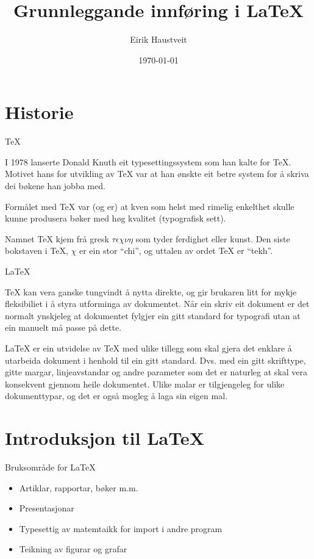 \documentclass[10pt,a4paper]{beamer}
\title{Grunnleggande innføring i \LaTeX}
\date{\today}
\author{Eirik Haustveit}
\institute{Institutt for datateknologi, elektroteknologi og realfag}
\begin{document}
	
	\titlepage
	
	\section{Historie}
	\label{sec:history}
	
	\begin{frame}{\TeX}
		
		I 1978 lanserte Donald Knuth eit typesettingssystem som han kalte for \TeX{}. Motivet hans for utvikling av \TeX{} var at han ønskte eit betre system for å skriva dei bøkene han jobba med.
		
		Formålet med \TeX{} var (og er) at kven som helst med rimelig enkelthet skulle kunne produsera bøker med høg kvalitet (typografisk sett).
		
		Namnet \TeX{} kjem frå gresk \(\tau\epsilon\chi\nu\eta\) som tyder ferdighet eller kunst. Den siste bokstaven i \TeX{}, $\chi$ er ein stor ``chi'', og uttalen av ordet \TeX{} er ``tekh''.
		
	\end{frame}
	
	\begin{frame}{\LaTeX}
		
		
		
		\TeX{} kan vera ganske tungvindt å nytta direkte, og gir brukaren litt for mykje fleksibiliet i å styra utforminga av dokumentet. Når ein skriv eit dokument er det normalt ynskjeleg at dokumentet fylgjer ein gitt standard for typografi utan at ein manuelt må passe på dette.
		
		\LaTeX{} er ein utvidelse av \TeX{} med ulike tillegg som skal gjera det enklare å utarbeida dokument i henhold til ein gitt standard. Dvs. med ein gitt skrifttype, gitte margar, linjeavstandar og andre parameter som det er naturleg at skal vera konsekvent gjennom heile dokumentet. Ulike malar er tilgjengeleg for ulike dokumenttypar, og det er også mogleg å laga sin eigen mal.
		
	\end{frame}
	
	\section{Introduksjon til \LaTeX}
	
	\begin{frame}{Bruksområde for \LaTeX}
		
		\begin{itemize}
			\item Artiklar, rapportar, bøker m.m.
			\item Presentasjonar
			\item Typesettig av matemtaikk for import i andre program
			\item Teikning av figurar og grafar
		\end{itemize}
		
	\end{frame}
\end{document}
